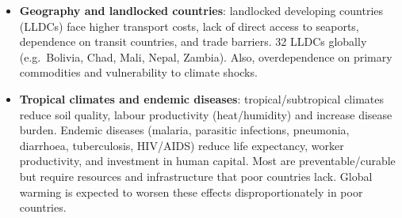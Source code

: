 \begin{itemize}
\begin{itemize}
    \item Oil-exporting countries deposited their new revenues in commercial banks in developed countries; the banks then aggressively \textbf{recycled these ``petrodollars''} as loans to developing countries. Lending was often imprudent, partly because banks assumed the public sector would cover losses. Loan funds were sometimes wasted on inefficient public enterprises, low tax collection, or corruption.
    \item After the \textbf{second oil shock (1979)}, countries either borrowed more or adopted restrictive fiscal/monetary policies; by the \textbf{early 1980s}, several Latin American and sub-Saharan African countries were on the verge of bankruptcy. From \textbf{1982}, the IMF, World Bank and US government intervened to prevent defaults (see the IMF/World Bank discussion in the strategies section).
  \end{itemize}
  \item \textbf{Geography and landlocked countries}: landlocked developing countries (LLDCs) face higher transport costs, lack of direct access to seaports, dependence on transit countries, and trade barriers. 32 LLDCs globally (e.g.\ Bolivia, Chad, Mali, Nepal, Zambia). Also, overdependence on primary commodities and vulnerability to climate shocks.
  \item \textbf{Tropical climates and endemic diseases}: tropical/subtropical climates reduce soil quality, labour productivity (heat/humidity) and increase disease burden. Endemic diseases (malaria, parasitic infections, pneumonia, diarrhoea, tuberculosis, HIV/AIDS) reduce life expectancy, worker productivity, and investment in human capital. Most are preventable/curable but require resources and infrastructure that poor countries lack. Global warming is expected to worsen these effects disproportionately in poor countries.
\end{itemize}

